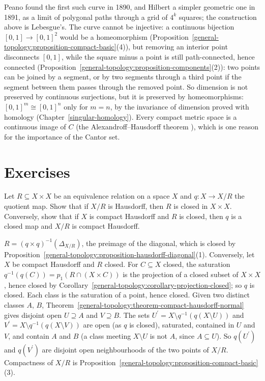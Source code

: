 Peano found the first such curve in 1890, and Hilbert a simpler geometric one in 1891, as a limit of polygonal paths through a grid of $4^k$ squares; the construction above is Lebesgue's. The curve
cannot be injective: a continuous bijection $[0, 1] \to [0, 1]^2$ would be a homeomorphism (Proposition~\ref{general-topology:proposition-compact-basic}(4)), but removing an interior point disconnects
$[0, 1]$, while the square minus a point is still path-connected, hence connected (Proposition~\ref{general-topology:proposition-components}(2)): two points can be joined by a segment, or by two segments
through a third point if the segment between them passes through the removed point. So dimension is not preserved by continuous surjections, but it is preserved by homeomorphisms: $[0, 1]^m \cong [0, 1]^n$
only for $m = n$, by the invariance of dimension proved with homology (Chapter~\ref{singular-homology}). Every compact metric space is a continuous image of $C$ (the Alexandroff--Hausdorff theorem \cite{kechris-1995}),
which is one reason for the importance of the Cantor set.

\section{Exercises}\label{general-topology:section-exercises}

\begin{exercise}\label{general-topology:exercise-hausdorff-diagonal}
Let $R \subseteq X \times X$ be an equivalence relation on a space $X$ and $q \colon X \to X/R$ the quotient map. Show that if $X/R$ is Hausdorff, then $R$ is closed in $X \times X$. Conversely, show that if $X$ is compact Hausdorff and $R$ is
closed, then $q$ is a closed map and $X/R$ is compact Hausdorff.
\end{exercise}

\begin{solution}
$R = (q \times q)^{-1}(\Delta_{X/R})$, the preimage of the diagonal, which is closed by Proposition~\ref{general-topology:proposition-hausdorff-diagonal}(1). Conversely, let $X$ be compact Hausdorff and $R$ closed. For $C \subseteq X$ closed, the
saturation $q^{-1}(q(C)) = p_1(R \cap (X \times C))$ is the projection of a closed subset of $X \times X$, hence closed by Corollary~\ref{general-topology:corollary-projection-closed}; so $q$ is closed. Each class is the saturation of a point,
hence closed. Given two distinct classes $A$, $B$, Theorem~\ref{general-topology:theorem-compact-hausdorff-normal} gives disjoint open $U \supseteq A$ and $V \supseteq B$. The sets $U^{\prime} = X \setminus q^{-1}(q(X \setminus U))$ and
$V^{\prime} = X \setminus q^{-1}(q(X \setminus V))$ are open (as $q$ is closed), saturated, contained in $U$ and $V$, and contain $A$ and $B$ (a class meeting $X \setminus U$ is not $A$, since $A \subseteq U$). So $q(U^{\prime})$ and
$q(V^{\prime})$ are disjoint open neighbourhoods of the two points of $X/R$. Compactness of $X/R$ is Proposition~\ref{general-topology:proposition-compact-basic}(3).
\end{solution}

